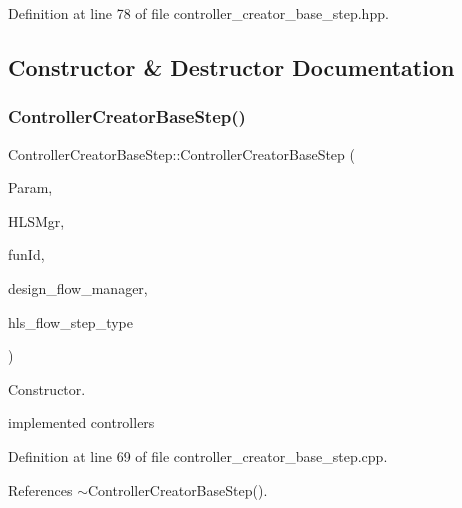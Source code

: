 Definition at line 78 of file controller\+\_\+creator\+\_\+base\+\_\+step.\+hpp.



\subsection{Constructor \& Destructor Documentation}
\mbox{\label{classControllerCreatorBaseStep_a3a40d6aa636355cf2059e04ea6f9e2af}} 
\subsubsection{\texorpdfstring{Controller\+Creator\+Base\+Step()}{ControllerCreatorBaseStep()}}
{\footnotesize\ttfamily Controller\+Creator\+Base\+Step\+::\+Controller\+Creator\+Base\+Step (\begin{DoxyParamCaption}\item[{const \hyperlink{Parameter_8hpp_a37841774a6fcb479b597fdf8955eb4ea}{Parameter\+Const\+Ref}}]{Param,  }\item[{const \hyperlink{hls__manager_8hpp_acd3842b8589fe52c08fc0b2fcc813bfe}{H\+L\+S\+\_\+manager\+Ref}}]{H\+L\+S\+Mgr,  }\item[{unsigned int}]{fun\+Id,  }\item[{const Design\+Flow\+Manager\+Const\+Ref}]{design\+\_\+flow\+\_\+manager,  }\item[{const \hyperlink{hls__step_8hpp_ada16bc22905016180e26fc7e39537f8d}{H\+L\+S\+Flow\+Step\+\_\+\+Type}}]{hls\+\_\+flow\+\_\+step\+\_\+type }\end{DoxyParamCaption})}



Constructor. 

implemented controllers 

Definition at line 69 of file controller\+\_\+creator\+\_\+base\+\_\+step.\+cpp.



References $\sim$\+Controller\+Creator\+Base\+Step().

